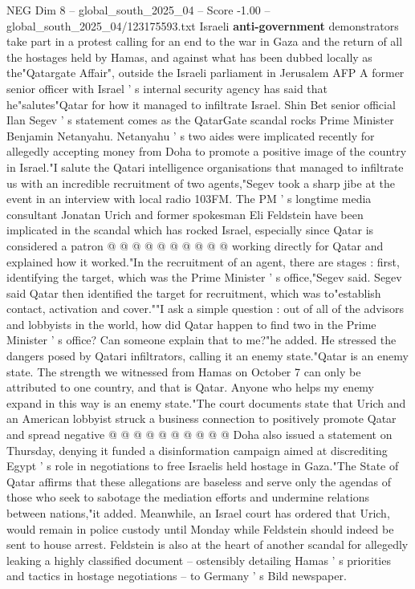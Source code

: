 \begin{textsample}{NEG Dim 8 – global\_south\_2025\_04 – Score -1.00 – global\_south\_2025\_04/123175593.txt}  \label{ex:f8_neg_286}
Israeli \textbf{anti-government} demonstrators take part in a protest calling for an end to the war in Gaza and the return of all the hostages held by Hamas, and against what has been dubbed locally as the"Qatargate Affair", outside the Israeli parliament in Jerusalem AFP A former senior officer with Israel ' s internal security agency has said that he"salutes"Qatar for how it managed to infiltrate Israel.
Shin Bet senior official Ilan Segev ' s statement comes as the QatarGate scandal rocks Prime Minister Benjamin Netanyahu.
Netanyahu ' s two aides were implicated recently for allegedly accepting money from Doha to promote a positive image of the country in Israel."I salute the Qatari intelligence organisations that managed to infiltrate us with an incredible recruitment of two agents,"Segev took a sharp jibe at the event in an interview with local radio 103FM.
The PM ' s longtime media consultant Jonatan Urich and former spokesman Eli Feldstein have been implicated in the scandal which has rocked Israel, especially since Qatar is considered a patron @ @ @ @ @ @ @ @ @ @ working directly for Qatar and explained how it worked."In the recruitment of an agent, there are stages : first, identifying the target, which was the Prime Minister ' s office,"Segev said.
Segev said Qatar then identified the target for recruitment, which was to"establish contact, activation and cover.""I ask a simple question : out of all of the advisors and lobbyists in the world, how did Qatar happen to find two in the Prime Minister ' s office?
Can someone explain that to me?"he added.
He stressed the dangers posed by Qatari infiltrators, calling it an enemy state."Qatar is an enemy state.
The strength we witnessed from Hamas on October 7 can only be attributed to one country, and that is Qatar.
Anyone who helps my enemy expand in this way is an enemy state."The court documents state that Urich and an American lobbyist struck a business connection to positively promote Qatar and spread negative @ @ @ @ @ @ @ @ @ @ Doha also issued a statement on Thursday, denying it funded a disinformation campaign aimed at discrediting Egypt ' s role in negotiations to free Israelis held hostage in Gaza."The State of Qatar affirms that these allegations are baseless and serve only the agendas of those who seek to sabotage the mediation efforts and undermine relations between nations,"it added.
Meanwhile, an Israel court has ordered that Urich, would remain in police custody until Monday while Feldstein should indeed be sent to house arrest.
Feldstein is also at the heart of another scandal for allegedly leaking a highly classified document -- ostensibly detailing Hamas ' s priorities and tactics in hostage negotiations -- to Germany ' s Bild newspaper.

\end{textsample}
